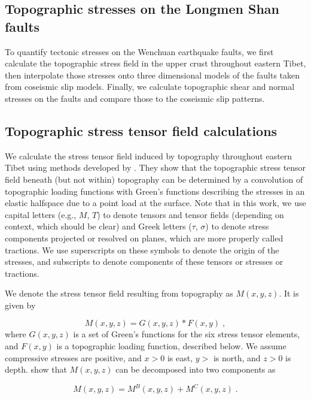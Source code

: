 \documentclass[draft,jgrga]{AGUTeX}
\begin{document}
\begin{article}
\section{Topographic stresses on the Longmen Shan
faults}\label{topographic-stresses-on-the-longmen-shan-faults}

To quantify tectonic stresses on the Wenchuan earthquake faults, we
first calculate the topographic stress field in the upper crust
throughout eastern Tibet, then interpolate those stresses onto three
dimensional models of the faults taken from coseismic slip models.
Finally, we calculate topographic shear and normal stresses on the
faults and compare those to the coseismic slip patterns.

\subsection{Topographic stress tensor field
calculations}\label{topographic-stress-tensor-field-calculations}

We calculate the stress tensor field induced by topography throughout
eastern Tibet using methods developed by 
\citet{liuzoback1992}. They show that the topographic stress tensor
field beneath (but not within) topography can be determined by a convolution of
topographic loading functions with Green's functions describing the stresses in
an elastic halfspace due to a point load at the surface. Note that in this
work, we use capital letters (e.g., $M$, $T$) to denote tensors and tensor
fields (depending on context, which should be clear) and Greek letters ($\tau$,
$\sigma$) to denote stress components projected or resolved on planes, which
are more properly called tractions. We use superscripts on these symbols to
denote the origin of the stresses, and subscripts to denote components of these
tensors or stresses or tractions.  

We denote the stress tensor field resulting from topography as $M(x,y,z)$. It
is given by

\begin{equation}
M(x, y, z) = G(x, y, z) * F(x, y) \; ,
\end{equation}
where $G(x,y,z)$ is a set of Green's functions for the six stress tensor
elements, and $F(x,y)$ is a topographic loading function, described
below. We assume compressive stresses are positive, and $x>0$ is east,
$y>$ is north, and $z>0$ is depth. \citet{liuzoback1992}
show that $M(x,y,z)$ can be decomposed into two components as

\begin{equation}
M(x,y,z) = M^B(x,y,z) + M^C(x,y,z) \; .
\end{equation}


\end{article}
\end{document}
